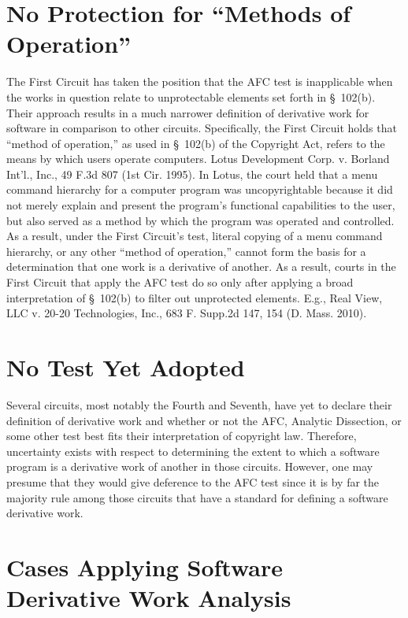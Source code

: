 \section{No Protection for ``Methods of Operation''}

The First Circuit has taken the position that the AFC test is inapplicable 
when the works in question relate to unprotectable elements set forth in 
\S~102(b).  Their approach results in a much narrower definition
of derivative work for software in comparison to other circuits. Specifically, 
the
First Circuit holds that ``method of operation,'' as used in \S~102(b) of
the Copyright Act, refers to the means by which users operate
computers. Lotus Development Corp. v. Borland Int'l., Inc., 49 F.3d 807
(1st Cir. 1995).  In Lotus, the court held that a menu command
hierarchy for a computer program was uncopyrightable because it did not
merely explain and present the program's functional capabilities to the
user, but also served as a method by which the program was operated and
controlled. As a result, under the First Circuit's test, literal copying
of a menu command hierarchy, or any other ``method of operation,'' cannot
form the basis for a determination that one work is a derivative of
another.  As a result, courts in the First Circuit that apply the AFC test
do so only after applying a broad interpretation of \S~102(b) to filter out
unprotected elements. E.g., Real View, LLC v. 20-20 Technologies, Inc., 
683 F. Supp.2d 147, 154 (D. Mass. 2010).


\section{No Test Yet Adopted}

Several circuits, most notably the Fourth and Seventh, have yet to
declare their definition of derivative work and whether or not the
AFC, Analytic Dissection, or some other test best fits their
interpretation of copyright law. Therefore, uncertainty exists with
respect to determining the extent to which a software program is a
derivative work of another in those circuits. However, one may presume
that they would give deference to the AFC test since it is by far the
majority rule among those circuits that have a standard for defining
a software derivative work.

\section{Cases Applying Software Derivative Work Analysis}

